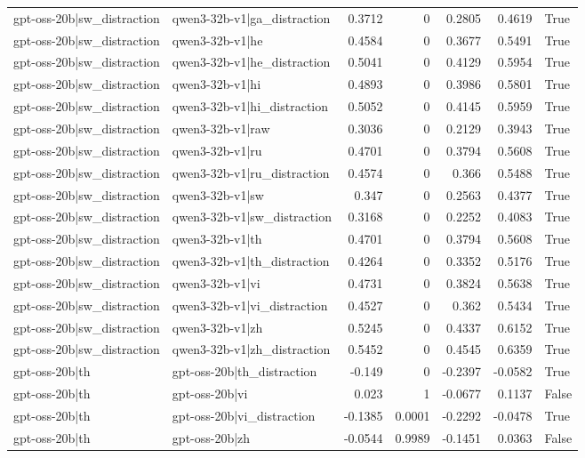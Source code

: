 \begin{table}
\begin{tabular}{l l r r r r l}
gpt-oss-20b|sw_distraction & qwen3-32b-v1|ga_distraction & 0.3712 & 0 & 0.2805 & 0.4619 & True \\
gpt-oss-20b|sw_distraction & qwen3-32b-v1|he & 0.4584 & 0 & 0.3677 & 0.5491 & True \\
gpt-oss-20b|sw_distraction & qwen3-32b-v1|he_distraction & 0.5041 & 0 & 0.4129 & 0.5954 & True \\
gpt-oss-20b|sw_distraction & qwen3-32b-v1|hi & 0.4893 & 0 & 0.3986 & 0.5801 & True \\
gpt-oss-20b|sw_distraction & qwen3-32b-v1|hi_distraction & 0.5052 & 0 & 0.4145 & 0.5959 & True \\
gpt-oss-20b|sw_distraction & qwen3-32b-v1|raw & 0.3036 & 0 & 0.2129 & 0.3943 & True \\
gpt-oss-20b|sw_distraction & qwen3-32b-v1|ru & 0.4701 & 0 & 0.3794 & 0.5608 & True \\
gpt-oss-20b|sw_distraction & qwen3-32b-v1|ru_distraction & 0.4574 & 0 & 0.366 & 0.5488 & True \\
gpt-oss-20b|sw_distraction & qwen3-32b-v1|sw & 0.347 & 0 & 0.2563 & 0.4377 & True \\
gpt-oss-20b|sw_distraction & qwen3-32b-v1|sw_distraction & 0.3168 & 0 & 0.2252 & 0.4083 & True \\
gpt-oss-20b|sw_distraction & qwen3-32b-v1|th & 0.4701 & 0 & 0.3794 & 0.5608 & True \\
gpt-oss-20b|sw_distraction & qwen3-32b-v1|th_distraction & 0.4264 & 0 & 0.3352 & 0.5176 & True \\
gpt-oss-20b|sw_distraction & qwen3-32b-v1|vi & 0.4731 & 0 & 0.3824 & 0.5638 & True \\
gpt-oss-20b|sw_distraction & qwen3-32b-v1|vi_distraction & 0.4527 & 0 & 0.362 & 0.5434 & True \\
gpt-oss-20b|sw_distraction & qwen3-32b-v1|zh & 0.5245 & 0 & 0.4337 & 0.6152 & True \\
gpt-oss-20b|sw_distraction & qwen3-32b-v1|zh_distraction & 0.5452 & 0 & 0.4545 & 0.6359 & True \\
gpt-oss-20b|th & gpt-oss-20b|th_distraction & -0.149 & 0 & -0.2397 & -0.0582 & True \\
gpt-oss-20b|th & gpt-oss-20b|vi & 0.023 & 1 & -0.0677 & 0.1137 & False \\
gpt-oss-20b|th & gpt-oss-20b|vi_distraction & -0.1385 & 0.0001 & -0.2292 & -0.0478 & True \\
gpt-oss-20b|th & gpt-oss-20b|zh & -0.0544 & 0.9989 & -0.1451 & 0.0363 & False \\

\end{tabular}
\end{table}
